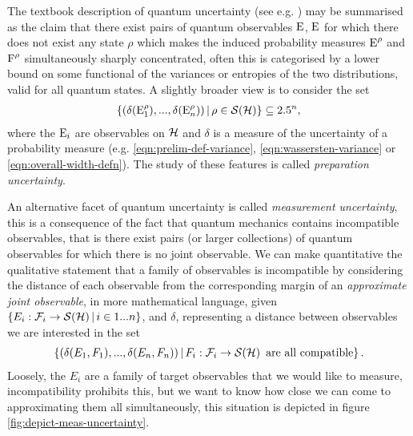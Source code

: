 The textbook description of quantum uncertainty (see e.g. \cite{Nielsen-Chuang}) may be summarised as the claim that there exist pairs of quantum observables $\operatorname{E}$, $\operatorname{E}$ for which there does not exist any state $\rho$ which makes the induced probability measures $\operatorname{E}^\rho$ and $\operatorname{F}^\rho$ simultaneously sharply concentrated, often this is categorised by a lower bound on some functional of the variances or entropies \cites{MaassenUffink1988}{Wehner_2010} of the two distributions, valid for all quantum states. A slightly broader view is to consider the set
\begin{align}
  \sbuild{\left(\delta(\ope_1^\rho),...,\delta(\ope_n^\rho)\right)}{\rho\in\dops[\hcal]} \subseteq \R^n,
\end{align}
where the $\operatorname{E}_i$ are observables on $\mathcal{H}$ and $\delta$ is a measure of the uncertainty of a probability measure (e.g. \eqref{eqn:prelim-def-variance}, \eqref{eqn:wassersten-variance} or \eqref{eqn:overall-width-defn}). The study of these features is called \emph{preparation uncertainty}.

An alternative facet of quantum uncertainty is called \emph{measurement uncertainty}, this is a consequence of the fact that quantum mechanics contains incompatible observables, that is there exist pairs (or larger collections) of quantum observables for which there is no joint observable. We can make quantitative the qualitative statement that a family of observables is incompatible by considering the distance of each observable from the corresponding margin of an \emph{approximate joint observable}, in more mathematical language, given $\sbuild{E_i:\fcal_i\to\dops[\hcal]}{i\in 1...n}$, and $\delta$, representing a distance between observables we are interested in the set
\begin{align}
  \sbuild{\left(\delta(E_1, F_1),...,\delta(E_n, F_n)\right)}{F_i:\fcal_i\to\dops[\hcal]  \text{ are all compatible}}.
\end{align}
Loosely, the $E_i$ are a family of target observables that we would like to measure, incompatibility prohibits this, but we want to know how close we can come to approximating them all simultaneously, this situation is depicted in figure \ref{fig:depict-meas-uncertainty}.

